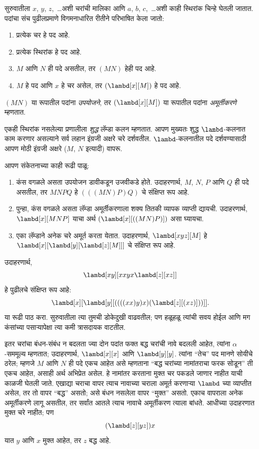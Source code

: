 \documentclass[../../../include/open-logic-section]{subfiles}
\begin{document}

सुरुवातीला $x$, $y$, $z$,~\dots अशी चरांची मालिका आणि $a$, $b$,
$c$,~\dots अशी काही स्थिरांक चिन्हे घेतली जातात. पदांचा संच पुढीलप्रमाणे
विगमनाधारित रीतीने परिभाषित केला जातो:
\begin{enumerate}
\item प्रत्येक चर हे पद आहे.
\item प्रत्येक स्थिरांक हे पद आहे.
\item $M$ आणि $N$ ही पदे असतील, तर $(MN)$ हेही पद आहे.
\item $M$ हे पद आणि $x$ हे चर असेल, तर $(\lambd[x][M])$ हे
  पद आहे.
\end{enumerate}
$(MN)$ या रूपातील पदांना \emph{उपयोजने}, तर $(\lambd[x][M])$
या रूपातील पदांना \emph{अमूर्तीकरणे} म्हणतात.

एकही स्थिरांक नसलेल्या प्रणालीला \emph{शुद्ध} लॅम्डा कलन म्हणतात.
आपण मुख्यतः शुद्ध $\lambd$-कलनात काम करणार असल्याने सर्व लहान इंग्रजी
अक्षरे चरे दर्शवतील. $\lambd$-कलनातील पदे दर्शवण्यासाठी आपण मोठी
इंग्रजी अक्षरे ($M$, $N$ इत्यादी) वापरू.

आपण संकेतनाच्या काही रूढी पाळू:

\begin{conv}
\begin{enumerate}
\item कंस वगळले असता उपयोजन डावीकडून उजवीकडे होते. उदाहरणार्थ,
  $M$, $N$, $P$ आणि $Q$ ही पदे असतील, तर $MNPQ$ हे
  $(((MN)P)Q)$ चे संक्षिप्त रूप आहे.
\item पुन्हा, कंस वगळले असता लॅम्डा अमूर्तीकरणाला शक्य तितकी
  व्यापक व्याप्ती द्यायची. उदाहरणार्थ, $\lambd[x][MNP]$ याचा
  अर्थ $(\lambd[x][((MN)P)])$ असा घ्यायचा.
\item एका लॅम्डाने अनेक चरे अमूर्त करता येतात. उदाहरणार्थ,
  $\lambd[xyz][M]$ हे
  $\lambd[x][\lambd[y][\lambd[z][M]]]$ चे संक्षिप्त रूप आहे.
\end{enumerate}
\end{conv}

उदाहरणार्थ,
\[
\lambd[xy][xxyx \lambd[z][xz]]
\]
हे पुढीलचे संक्षिप्त रूप आहे:
\[
\lambd[x][\lambd[y][((((xx)y)x)(\lambd[z][(xz)]))]].
\]
या रूढी पाठ करा. सुरुवातीला त्या तुमची डोकेदुखी वाढवतील;
पण हळूहळू त्यांची सवय होईल आणि मग कंसांच्या पसाऱ्यापेक्षा
त्या कमी त्रासदायक वाटतील.

इतर चरांचा बंधन-संबंध न बदलता ज्या दोन पदांत फक्त
बद्ध चरांची नावे बदलली आहेत, त्यांना
$\alpha$-सममूल्य म्हणतात; उदाहरणार्थ, $\lambd[x][x]$ आणि
$\lambd[y][y]$. त्यांना “तेच” पद मानणे सोयीचे ठरेल; म्हणजे
$M$ आणि $N$ ही पदे एकच आहेत असे म्हणताना “बद्ध चरांच्या
नामांतराचा फरक सोडून” ती एकच आहेत, असाही अर्थ अभिप्रेत असेल.
हे नामांतर करताना मुक्त चर पकडले जाणार नाहीत याची काळजी घेतली जाते.
एखाद्या चराचा वापर त्याच नावाच्या चराला अमूर्त करणाऱ्या
$\lambd$ च्या व्याप्तीत असेल, तर तो वापर “बद्ध” असतो;
असे बंधन नसलेला वापर “मुक्त” असतो. एकाच वापराला अनेक
अमूर्तीकरणे लागू असतील, तर सर्वांत आतले त्याच नावाचे अमूर्तीकरण
त्याला बांधते. आधीच्या उदाहरणात मुक्त चरे नाहीत; पण
\[
(\lambd[z][yz])x
\]
यात $y$ आणि $x$ मुक्त आहेत, तर $z$ बद्ध आहे.
\end{document}
